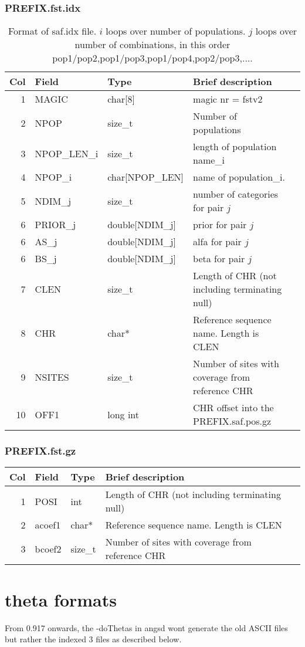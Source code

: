 \documentclass[10pt]{article}
\begin{document}
\subsubsection{PREFIX.fst.idx}
\begin{table}[h]
\begin{tabular}{rllll}
  \hline
  {\bf Col} & {\bf Field} & {\bf Type} & {\bf Brief description} \\
  \hline
  1 & {\sf MAGIC} & char[8] &  magic nr = fstv2\\
  2 & {\sf NPOP} & size\_t &  Number of populations\\
  \hline \hline
  3 & {\sf NPOP\_LEN\_i} & size\_t &  length of population name\_i\\
  4 & {\sf NPOP\_i} & char[NPOP\_LEN] &  name of population\_i.\\
  \hline\hline
  5 & {\sf NDIM\_j} & size\_t & number of categories for pair $j$   \\
  6 & {\sf PRIOR\_j} & double[NDIM\_j] &  prior for pair $j$\\
  \hline\hline
  6 & {\sf AS\_j} & double[NDIM\_j] &  alfa for pair $j$\\
  6 & {\sf BS\_j} & double[NDIM\_j] &  beta for pair $j$\\
  \hline\hline
  7 & {\sf CLEN} & size\_t &  Length of CHR (not including terminating null)\\
  8 & {\sf CHR} & char* & Reference sequence name. Length is CLEN\\
  9 & {\sf NSITES} & size\_t & Number of sites with coverage from reference CHR\\
  10 & {\sf OFF1} & long int & CHR offset into the PREFIX.saf.pos.gz \\
  \hline
\end{tabular}\label{tab4}
\caption{Format of saf.idx file. $i$ loops over number of populations. $j$ loops over number of combinations, in this order pop1/pop2,pop1/pop3,pop1/pop4,pop2/pop3,$\ldots$.}
\end{table}
\subsubsection{PREFIX.fst.gz}
\begin{table}[h]
\begin{tabular}{rllll}
  \hline
  {\bf Col} & {\bf Field} & {\bf Type} & {\bf Brief description} \\
  \hline
  1 & {\sf POSI} & int &  Length of CHR (not including terminating null)\\
  2 & {\sf acoef1} & char* & Reference sequence name. Length is CLEN\\
  3 & {\sf bcoef2} & size\_t & Number of sites with coverage from reference CHR\\
  \hline
\end{tabular}\label{tab5}
\end{table}

\section{theta formats}
From 0.917 onwards, the -doThetas in angsd wont generate the old ASCII files but rather the indexed 3 files as described below.
\end{document}

